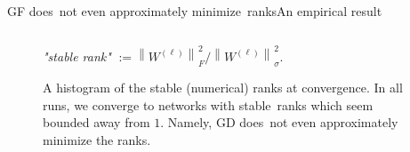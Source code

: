 \documentclass[handout,usenames,dvipsnames]{beamer} %
\newcommand{\norm}[2][]{{\left\|{#2}\right\|_{#1}}}
\begin{document}
\begin{frame}{GF does~not even approximately minimize~ranks}{An empirical result}
    \begin{figure}[t]
        \begin{columns}
            
            \emph{"stable rank"} $:= {\norm{W^{(\ell)}}^2_F} / {\norm{W^{(\ell)}}^2_\sigma}$.
        \end{columns}
        \centering
        \caption{A histogram of the stable (numerical) ranks at convergence. In all runs, we converge to networks with stable~ranks which seem bounded away from $1$. Namely, GD does~not even approximately minimize the ranks.}
    \label{fig:empirical-high-f2s}
    \end{figure}
    

\end{frame}
\end{document}
